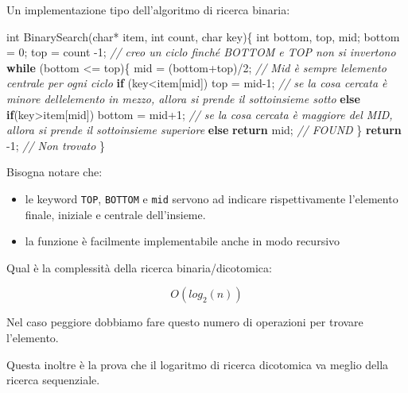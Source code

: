 \documentclass[
]{article}
\newenvironment{Shaded}{}{}
\newcommand{\CommentTok}[1]{\textcolor[rgb]{0.38,0.63,0.69}{\textit{#1}}}
\newcommand{\ControlFlowTok}[1]{\textcolor[rgb]{0.00,0.44,0.13}{\textbf{#1}}}
\newcommand{\DataTypeTok}[1]{\textcolor[rgb]{0.56,0.13,0.00}{#1}}
\newcommand{\DecValTok}[1]{\textcolor[rgb]{0.25,0.63,0.44}{#1}}
\newcommand{\NormalTok}[1]{#1}
\begin{document}
Un implementazione tipo dell'algoritmo di ricerca binaria:

\begin{Shaded}
\begin{Highlighting}[]
\DataTypeTok{int}\NormalTok{ BinarySearch(}\DataTypeTok{char}\NormalTok{* item, }\DataTypeTok{int}\NormalTok{ count, }\DataTypeTok{char}\NormalTok{ key)\{}
	\DataTypeTok{int}\NormalTok{ bottom, top, mid;}
\NormalTok{    bottom = }\DecValTok{0}\NormalTok{;}
\NormalTok{    top = count {-}}\DecValTok{1}\NormalTok{;}
   	\CommentTok{// creo un ciclo finché BOTTOM e TOP non si invertono}
    \ControlFlowTok{while}\NormalTok{ (bottom \textless{}= top)\{}
\NormalTok{        mid = (bottom+top)/}\DecValTok{2}\NormalTok{; }\CommentTok{// Mid è sempre l\textquotesingle{}elemento centrale per ogni ciclo}
        \ControlFlowTok{if}\NormalTok{ (key\textless{}item[mid]) top = mid{-}}\DecValTok{1}\NormalTok{; }\CommentTok{// se la cosa cercata è minore dell\textquotesingle{}elemento in mezzo, allora si prende il sottoinsieme sotto}
        	\ControlFlowTok{else} \ControlFlowTok{if}\NormalTok{(key\textgreater{}item[mid]) bottom = mid+}\DecValTok{1}\NormalTok{;}
        \CommentTok{// se la cosa cercata è maggiore del MID, allora si prende il sottoinsieme superiore}
        \ControlFlowTok{else} \ControlFlowTok{return}\NormalTok{ mid; }\CommentTok{// FOUND}
\NormalTok{    \}}
    \ControlFlowTok{return}\NormalTok{ {-}}\DecValTok{1}\NormalTok{; }\CommentTok{// Non trovato}
\NormalTok{\}}
\end{Highlighting}
\end{Shaded}

Bisogna notare che:

\begin{itemize}
\item
  le keyword \texttt{TOP}, \texttt{BOTTOM} e \texttt{mid} servono ad
  indicare rispettivamente l'elemento finale, iniziale e centrale
  dell'insieme.
\item
  la funzione è facilmente implementabile anche in modo recursivo
\end{itemize}

Qual è la complessità della ricerca binaria/dicotomica:

\[O(log_2(n))\]

Nel caso peggiore dobbiamo fare questo numero di operazioni per trovare
l'elemento.

Questa inoltre è la prova che il logaritmo di ricerca dicotomica va
meglio della ricerca sequenziale.
\end{document}
